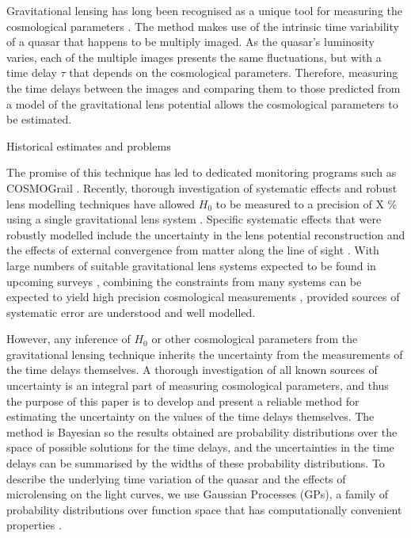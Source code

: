 \documentclass[useAMS,usenatbib, a4paper]{mn2e} \usepackage{natbib}
\begin{document}
Gravitational lensing has long been recognised as a unique tool for measuring
the cosmological parameters \citep{schechter}. The method makes use of the
intrinsic time variability of a quasar that happens to be multiply imaged. As
the quasar's luminosity varies, each of the multiple images presents the same
fluctuations, but with a time delay $\tau$ that depends on the cosmological
parameters. Therefore, measuring the time delays between the images and
comparing them to those predicted from a model of the gravitational lens
potential allows the cosmological parameters to be estimated.

Historical estimates and problems

The promise of this technique has led to dedicated monitoring programs such as
COSMOGrail \citep[][]{2005A&A...436...25E, 2008A&A...488..481V}. Recently,
thorough investigation of systematic effects and robust lens modelling
techniques have allowed $H_0$ to be measured to a precision of X \% using a
single gravitational lens system \citep{2010ApJ...711..201S}. Specific
systematic effects that were robustly modelled include the uncertainty in the
lens potential reconstruction \citep{2009ApJ...691..277S} and the effects of
external convergence from matter along the line of sight
\citep{2006ApJ...642...30F, 2010ApJ...711..201S}. With large numbers of
suitable gravitational lens systems expected to be found in upcoming surveys
\citep{2010MNRAS.405.2579O}, combining the constraints from many systems can
be expected to yield high precision cosmological measurements
\citep{2010ApJ...712.1378P}, provided sources of systematic error are
understood and well modelled.

However, any inference of $H_0$ or other cosmological parameters
from the gravitational lensing technique inherits
the uncertainty from the measurements of the time delays themselves. A
thorough investigation of all known sources of uncertainty is an integral part
of measuring cosmological parameters, and thus the purpose of this paper is to
develop and present a reliable method for estimating the uncertainty on the
values of the time delays themselves. The method is Bayesian
\citep{2004kats.book.....O} so the results obtained are probability
distributions over the space of possible solutions for the time delays, and the uncertainties in the time delays
can be summarised by the widths of these probability distributions. To describe
the underlying time variation of the quasar and the effects of microlensing on
the light curves, we use Gaussian Processes (GPs), a family of probability
distributions over function space that has computationally convenient
properties \citep{rasmussen}.
\end{document}
